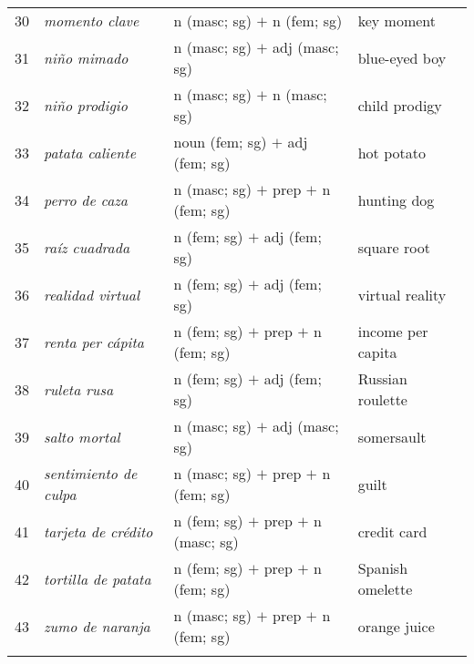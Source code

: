 \documentclass[output=paper]{langsci/langscibook}
\begin{document}
\begin{table}[H]
{\begin{tabular}{c|lll}
30 & \textit{momento clave} & n (masc; sg) $+$ n (fem; sg) & key moment \\
31 & \textit{niño mimado} & n (masc; sg) $+$ adj (masc; sg) & blue-eyed boy \\
32 & \textit{niño prodigio} & n (masc; sg) $+$ n (masc; sg) & child prodigy \\
33 & \textit{patata caliente} & noun (fem; sg) $+$ adj (fem; sg) & hot potato \\
34 & \textit{perro de caza} & n (masc; sg) $+$ prep $+$ n (fem; sg) & hunting dog \\
35 & \textit{raíz cuadrada} & n (fem; sg) $+$ adj (fem; sg) & square root \\
36 & \textit{realidad virtual} & n (fem; sg) $+$ adj (fem; sg) & virtual reality \\
37 & \textit{renta per cápita} & n (fem; sg) $+$ prep $+$ n (fem; sg) & income per capita \\
38 & \textit{ruleta rusa} & n (fem; sg) $+$ adj (fem; sg) & Russian roulette \\
39 & \textit{salto mortal} & n (masc; sg) $+$ adj (masc; sg) & somersault \\
40 & \textit{sentimiento de culpa} & n (masc; sg) $+$ prep $+$ n (fem; sg) & guilt \\
41 & \textit{tarjeta de crédito} & n (fem; sg) $+$ prep $+$ n (masc; sg) & credit card \\
42 & \textit{tortilla de patata} & n (fem; sg) $+$ prep $+$ n (fem; sg) & Spanish omelette \\
43 & \textit{zumo de naranja} & n (masc; sg) $+$ prep $+$ n (fem; sg) & orange juice\\
\lspbottomrule
\end{tabular}
}
\end{table}
\end{document}
